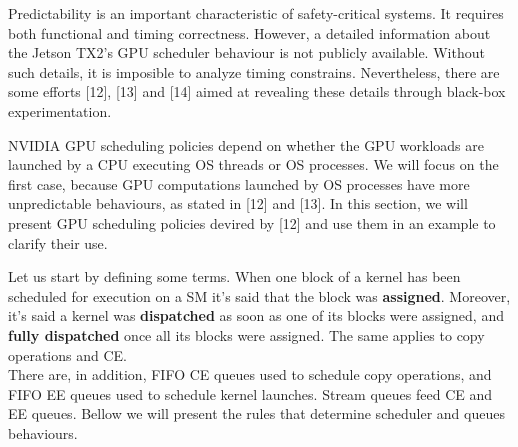 \documentclass[
  12pt,
  a4paperpaper,
]{report}
\begin{document}
Predictability is an important characteristic of safety-critical
systems. It requires both functional and timing correctness. However, a
detailed information about the Jetson TX2's GPU scheduler behaviour is
not publicly available. Without such details, it is imposible to analyze
timing constrains. Nevertheless, there are some efforts {[}12{]},
{[}13{]} and {[}14{]} aimed at revealing these details through black-box
experimentation.

NVIDIA GPU scheduling policies depend on whether the GPU workloads are
launched by a CPU executing OS threads or OS processes. We will focus on
the first case, because GPU computations launched by OS processes have
more unpredictable behaviours, as stated in {[}12{]} and {[}13{]}. In
this section, we will present GPU scheduling policies devired by
{[}12{]} and use them in an example to clarify their use.

Let us start by defining some terms. When one block of a kernel has been
scheduled for execution on a SM it's said that the block was
\textbf{assigned}. Moreover, it's said a kernel was \textbf{dispatched}
as soon as one of its blocks were assigned, and \textbf{fully
dispatched} once all its blocks were assigned. The same applies to copy
operations and CE.\\
There are, in addition, FIFO CE queues used to schedule copy operations,
and FIFO EE queues used to schedule kernel launches. Stream queues feed
CE and EE queues. Bellow we will present the rules that determine
scheduler and queues behaviours.
\end{document}
